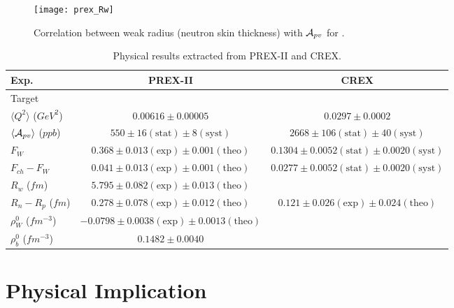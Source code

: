 \begin{figure}
    \centering
    \texttt{[image: prex\_Rw]}
    \caption{Correlation between weak radius (neutron skin thickness) with $\mathcal{A}_{pv}$ for \Pb.}
    \label{fig:prex_Rw}
\end{figure}

\begin{table}[!h]
    \centering
    \begin{tabular}{l | c c}
	\hline
	Exp.	& PREX-II   & CREX  \\
	\hline
	Target	& \Pb	    & \Ca   \\
	$\langle Q^2 \rangle $ ($GeV^2$)	& $ 0.00616 \pm 0.00005 $   & $0.0297 \pm 0.0002 $  \\
	$\langle \mathcal{A}_{pv} \rangle$ ($ppb$)   & $550 \pm 16 (\text{stat}) \pm 8 (\text{syst})$	& $2668 \pm 106 (\text{stat}) \pm 40 (\text{syst})$ \\
	$F_W$	& $0.368 \pm 0.013 (\text{exp}) \pm 0.001 (\text{theo})$    & $0.1304 \pm 0.0052 (\text{stat}) \pm 0.0020 (\text{syst})$    \\
	$F_{ch} - F_W$	& $0.041 \pm 0.013 (\text{exp}) \pm 0.001 (\text{theo})$    & $0.0277 \pm 0.0052 (\text{stat}) \pm 0.0020 (\text{syst})$    \\
	$R_w$ ($fm$)	& $5.795 \pm 0.082 (\text{exp}) \pm 0.013 (\text{theo})$    &	\\
	$R_n - R_p$ ($fm$)  & $0.278 \pm 0.078 (\text{exp}) \pm 0.012 (\text{theo})$	& $0.121 \pm 0.026 (\text{exp}) \pm 0.024 (\text{theo})$    \\
	$\rho_W^0$ ($fm^{-3}$)	& $-0.0798 \pm 0.0038 (\text{exp}) \pm 0.0013 (\text{theo})$	&   \\
	$\rho_b^0$ ($fm^{-3}$)	& $0.1482 \pm 0.0040 $	&   \\
	\hline
    \end{tabular}
    \caption{Physical results extracted from PREX-II and CREX.}
    \label{fig:pcrex_neutron_skin}
\end{table}

\section{Physical Implication}

